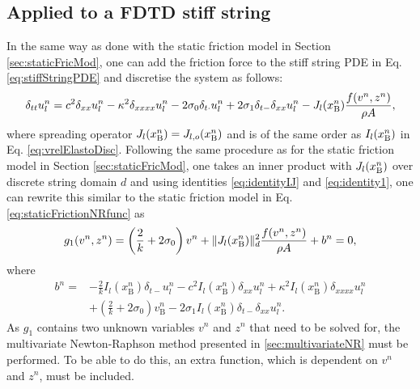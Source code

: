 \subsection{Applied to a FDTD stiff string}
In the same way as done with the static friction model in Section \ref{sec:staticFricMod}, one can add the friction force to the stiff string PDE in Eq. \eqref{eq:stiffStringPDE} and discretise the system as follows:
%
\begin{equation}\label{eq:elastoStiffStringFDS}
    \delta_{tt} u_l^n = c^2 \delta_{xx} u_l^n - \kappa^2 \delta_{xxxx} u_l^n - 2 \sigma_{0} \delta_{t\cdot} u_l^n + 2 \sigma_{1}\delta_{t-}\delta_{xx} u_l^n - J_l(x_{\text{B}}^n)\frac{f(v^n,z^n)}{\rho A},
\end{equation}
where spreading operator $J_l(x_{\text{B}}^n) = J_{l,o}(x_{\text{B}}^n)$ and is of the same order as $I_l(x_{\text{B}}^n)$ in Eq. \eqref{eq:vrelElastoDisc}. Following the same procedure as for the static friction model in Section \ref{sec:staticFricMod}, one takes an inner product with $J_l(x_{\text{B}}^n)$ over discrete string domain $d$ and using identities \eqref{eq:identityIJ} and \eqref{eq:identity1}, one can rewrite this similar to the static friction model in Eq. \eqref{eq:staticFrictionNRfunc} as
%
\begin{equation}\label{eq:elastog1}
    g_1(v^n,z^n) = \left(\frac{2}{k} + 2\sigma_{0}\right)v^n + \lVert J_l(x_{\text{B}}^n)\rVert_d^2\frac{f(v^n,z^n)}{\rho A}+ b^n= 0,
\end{equation}
where
\begin{align*}
    b^n =&-\frac{2}{k}I_l(x_\text{B}^n)\delta_{t-}u_l^n - c^2 I_l(x_\text{B}^n)\delta_{xx} u_l^n +\kappa^2I_l(x_\text{B}^n)\delta_{xxxx} u_l^n\\
    &+\left(\frac{2}{k}+ 2\sigma_0\right)v_\text{B}^n-2\sigma_1I_l(x_\text{B}^n)\delta_{t-}\delta_{xx}u_l^n.
\end{align*}
As $g_1$ contains two unknown variables $v^n$ and $z^n$ that need to be solved for, the multivariate Newton-Raphson method presented in \ref{sec:multivariateNR} must be performed. To be able to do this, an extra function, which is dependent on $v^n$ and $z^n$, must be included. 

